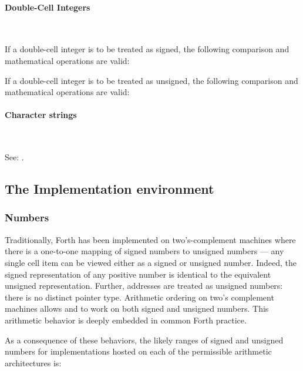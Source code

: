 \paragraph{Double-Cell Integers} ~ %

If a double-cell integer is to be treated as signed, the following
comparison and mathematical operations are valid:
\begin{quote}\ttfamily
					
				
			
			
\end{quote}
If a double-cell integer is to be treated as unsigned, the following
comparison and mathematical operations are valid:
\begin{quote}\ttfamily
		
			
\end{quote}


\paragraph{Character strings} ~ %

See: .


\subsection{The Implementation environment} %

\subsubsection{Numbers} %

Traditionally, Forth has been implemented on two's-complement machines
where there is a one-to-one mapping of signed numbers to unsigned
numbers --- any single cell item can be viewed either as a signed or
unsigned number. Indeed, the signed representation of any positive
number is identical to the equivalent unsigned representation. Further,
addresses are treated as unsigned numbers: there is no distinct pointer
type. Arithmetic ordering on two's complement machines allows \word{+}
and \word{-} to work on both signed and unsigned numbers. This
arithmetic behavior is deeply embedded in common Forth practice.

As a consequence of these behaviors, the likely ranges of signed and
unsigned numbers for implementations hosted on each of the permissible
arithmetic architectures is:

